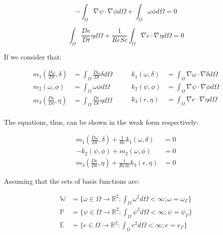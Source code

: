 \begin{equation} \label{stream weak}
 - \int_{\Omega} \nabla \psi \cdot \nabla \phi d\Omega
 + \int_{\Omega} \omega \phi d\Omega = 0
\end{equation}

\begin{equation} \label{concentration weak} 
   \int_{\Omega} \frac{D e}{Dt} \eta d\Omega
 + \frac{1}{\textit{ReSc}} \int_{\Omega} \nabla e \cdot \nabla \eta d\Omega 
 = 0
\end{equation}


\medskip
\noindent
If we consider that:

\begin{equation}
 \begin{aligned}
  \textbf{$m_1$}(\frac{D \omega}{Dt},\delta) & = \int_{\Omega} \frac{D \omega}{Dt} \delta d\Omega \\ 
  \textbf{$m_2$}(\omega,\phi) & = \int_{\Omega} \omega \phi d\Omega \\
  \textbf{$m_3$}(\frac{De}{Dt},\eta) & = \int_{\Omega} \frac{De}{Dt} \eta d\Omega \\
 \end{aligned}
 \qquad
 \begin{aligned}  
  \textbf{$k_1$}(\omega,\delta) & = \int_{\Omega} \nabla \omega \cdot \nabla \delta d\Omega \\
  \textbf{$k_2$}(\psi,\phi) & = \int_{\Omega} \nabla \psi \cdot \nabla \phi d\Omega \\
  \textbf{$k_3$}(e,\eta) & = \int_{\Omega} \nabla e \cdot \nabla \eta d\Omega \\
 \end{aligned}
\end{equation}

\noindent
The equations, thus, can be shown in the weak form respectively:

\begin{align}
 \textbf{$m_1$}(\frac{D \omega}{Dt},\delta) 
 + \frac{1}{\textit{Re}}\textbf{$k_1$}(\omega,\delta) 
 & = 0 \\
 - \textbf{$k_2$}(\psi,\phi) 
 + \textbf{$m_2$}(\omega,\phi) 
 & = 0 \\
 \textbf{$m_3$}(\frac{De}{Dt},\eta) 
 + \frac{1}{\textit{ReSc}}\textbf{$k_3$}(e,\eta) 
 & = 0
\end{align}


\noindent
Assuming that the sets of basis functions are:

\begin{equation}
 \begin{aligned}
  \mathbb{W} &= \{\omega \in \Omega \rightarrow \mathbb{R}^2
  : \int_\Omega \omega^2 d\Omega < \infty 
  ; \omega = \omega_\Gamma\} \\
  \mathbb{P} &= \{\psi \in \Omega \rightarrow \mathbb{R}^2
  : \int_\Omega \psi^2 d\Omega < \infty 
  ; \psi = \psi_\Gamma\} \\
  \mathbb{E} &= \{e \in \Omega \rightarrow \mathbb{R}^2
  : \int_\Omega e^2 d\Omega < \infty 
  ; e = e_\Gamma\}
 \end{aligned}
\end{equation}

